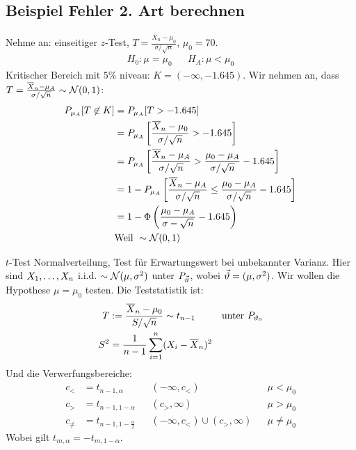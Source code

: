 \BoxEnd{}
\BoxStart{}
\subsection{Beispiel Fehler 2. Art berechnen}
Nehme an: einseitiger $z$-Test, $T = \frac{\overline{X}_n - \mu_0}{\sigma /
    \sqrt{n}}$, $\mu_0 = 70$.
\begin{align*}
  H_0 : \mu = \mu_0 &  & H_A : \mu < \mu_0
\end{align*}
Kritischer Bereich mit $5$\% niveau: $K =  (- \infty, -1.645)$. Wir
nehmen an, dass $T = \frac{\overline{X}_n - \mu_A}{\sigma / \sqrt{n}} \sim \mathcal{N} (0, 1)$:
\begin{align*}
  P_{\mu_A}[T \not \in K]
   & = P_{\mu_A}[T > -1.645]                                                                                                            \\
   & = P_{\mu_A} \left[\frac{\overline{X}_n - \mu_0}{\sigma / \sqrt{n}} > -1.645 \right]                                                \\
   & = P_{\mu_A} \left[\frac{\overline{X}_n - \mu_A}{\sigma / \sqrt{n}} > \frac{\mu_0 - \mu_A}{\sigma / \sqrt{n}} -1.645 \right]        \\
   & = 1 - P_{\mu_A} \left[\frac{\overline{X}_n - \mu_A}{\sigma / \sqrt{n}} \leq \frac{\mu_0 - \mu_A}{\sigma / \sqrt{n}} -1.645 \right] \\
   & = 1 - \Phi \left( \frac{\mu_0 - \mu_A}{\sigma - \sqrt{n}} - 1.645 \right)                                                          \\
   & \text{Weil } \sim \mathcal{N} (0, 1)
\end{align*}
\BoxEnd{}
\begin{definition}{$t$-Test}
  \color{red} Normalverteilung, Test für Erwartungswert bei unbekannter Varianz. \color{black} Hier sind
  $X_1, \dots, X_n$ i.i.d. $\sim \mathcal{N} (\mu, \sigma^2)$ unter $P_{\vec{\vartheta}}$, wobei
  $\vec{\vartheta} = (\mu, \sigma^2)$. Wir wollen die Hypothese $\mu = \mu_0$ testen.
  Die Teststatistik ist:
  \begin{align*}
    T   & := \frac{\overline{X}_n - \mu_0}{S / \sqrt{n}} \sim t_{n-1}
        &                                                             & \text{unter } P_{\vartheta_0} \\
    S^2 & = \frac{1}{n-1} \sum_{i = 1}^n  (X_i - \overline{X}_n)^2
  \end{align*}
  Und die Verwerfungsbereiche:
  \begin{align*}
    c_<      & = t_{n-1, \alpha}               &  & (-\infty, c_<)                     &  & \mu < \mu_0    \\
    c_>      & = t_{n-1, 1 - \alpha}           &  & (c_>, \infty)                      &  & \mu > \mu_0    \\
    c_{\neq} & = t_{n-1, 1 - \frac{\alpha}{2}} &  & (-\infty, c_<) \cup  (c_>, \infty) &  & \mu \neq \mu_0
  \end{align*}
  Wobei gilt $t_{m, \alpha} = -t_{m, 1 - \alpha}$.
\end{definition}
